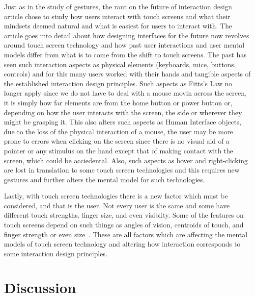 \documentclass[a4paper]{article}
\begin{document}
     Just as in the study of gestures, the rant on the future of interaction design article chose to study how users interact with touch screens and what their mindsets deemed natural and what is easiest for users to interact with. The article goes into detail about how designing interfaces for the future now revolves around touch screen technology and how past user interactions and user mental models differ from what is to come from the shift to touch screens. The past has seen such interaction aspects as physical elements (keyboards, mice, buttons, controls) and for this many users worked with their hands and tangible aspects of the established interaction design principles. Such aspects as Fitts's Law no longer apply since we do not have to deal with a mouse movin across the screen, it is simply how far elements are from the home button or power button or, depending on how the user interacts with the screen, the side or wherever they might be grasping it. This also alters such aspects as Human Interface objects, due to the loss of the physical interaction of a mouse, the user may be more prone to errors when clicking on the screen since there is no visual aid of a pointer or any stimulus on the hand except that of making contact with the screen, which could be acciedental. Also, such aspects as hover and right-clicking are lost in translation to some touch screen technologies and this requires new gestures and further alters the mental model for such technologies. 
     
     Lastly, with touch screen technologies there is a new factor which must be considered, and that is the user. Not every user is the same and some have different touch strengths, finger size, and even visiblity. Some of the features on touch screens depend on such things as angles of vision, centroids of touch, and finger strength or even size~\cite{Hands}. These are all factors which are affecting the mental models of touch screen technology and altering how interaction corresponds to some interaction design principles. 

\section{Discussion}
\end{document}
